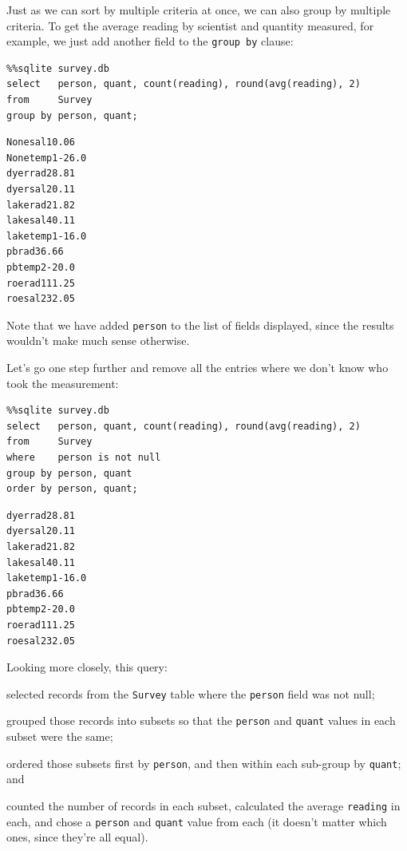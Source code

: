 \documentclass{book}
\begin{document}
Just as we can sort by multiple criteria at once, we can also group by
multiple criteria. To get the average reading by scientist and quantity
measured, for example, we just add another field to the
\texttt{group by} clause:

\begin{verbatim}
%%sqlite survey.db
select   person, quant, count(reading), round(avg(reading), 2)
from     Survey
group by person, quant;
\end{verbatim}

\begin{verbatim}
Nonesal10.06
Nonetemp1-26.0
dyerrad28.81
dyersal20.11
lakerad21.82
lakesal40.11
laketemp1-16.0
pbrad36.66
pbtemp2-20.0
roerad111.25
roesal232.05
\end{verbatim}

Note that we have added \texttt{person} to the list of fields displayed,
since the results wouldn't make much sense otherwise.

Let's go one step further and remove all the entries where we don't know
who took the measurement:

\begin{verbatim}
%%sqlite survey.db
select   person, quant, count(reading), round(avg(reading), 2)
from     Survey
where    person is not null
group by person, quant
order by person, quant;
\end{verbatim}

\begin{verbatim}
dyerrad28.81
dyersal20.11
lakerad21.82
lakesal40.11
laketemp1-16.0
pbrad36.66
pbtemp2-20.0
roerad111.25
roesal232.05
\end{verbatim}

Looking more closely, this query:

\begin{swcenumerate}
\item
  selected records from the \texttt{Survey} table where the
  \texttt{person} field was not null;
\item
  grouped those records into subsets so that the \texttt{person} and
  \texttt{quant} values in each subset were the same;
\item
  ordered those subsets first by \texttt{person}, and then within each
  sub-group by \texttt{quant}; and
\item
  counted the number of records in each subset, calculated the average
  \texttt{reading} in each, and chose a \texttt{person} and
  \texttt{quant} value from each (it doesn't matter which ones, since
  they're all equal).
\end{swcenumerate}
\end{document}
